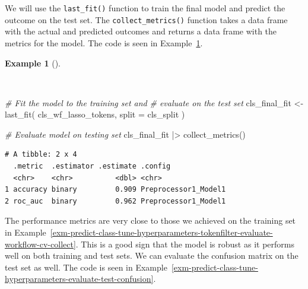 \documentclass[
  letterpaper,
]{book}
\newenvironment{Shaded}{\begin{snugshade}}{\end{snugshade}}
\newcommand{\AttributeTok}[1]{\textcolor[rgb]{0.00,0.00,0.00}{#1}}
\newcommand{\CommentTok}[1]{\textcolor[rgb]{0.00,0.00,0.00}{\textit{#1}}}
\newcommand{\FunctionTok}[1]{\textcolor[rgb]{0.00,0.00,0.00}{#1}}
\newcommand{\NormalTok}[1]{\textcolor[rgb]{0.00,0.00,0.00}{#1}}
\newcommand{\OtherTok}[1]{\textcolor[rgb]{0.00,0.00,0.00}{#1}}
\newcommand{\SpecialCharTok}[1]{\textcolor[rgb]{0.00,0.00,0.00}{#1}}
\theoremstyle{definition}
\newtheorem{example}{Example}[chapter]
\theoremstyle{remark}
\begin{document}
We will use the \texttt{last\_fit()} function to train the final model
and predict the outcome on the test set. The \texttt{collect\_metrics()}
function takes a data frame with the actual and predicted outcomes and
returns a data frame with the metrics for the model. The code is seen in
Example~\ref{exm-predict-class-tune-hyperparameters-evaluate-test}.

\begin{example}[]\protect\hypertarget{exm-predict-class-tune-hyperparameters-evaluate-test}{}\label{exm-predict-class-tune-hyperparameters-evaluate-test}

~

\begin{Shaded}
\begin{Highlighting}[]
\CommentTok{\# Fit the model to the training set and}
\CommentTok{\# evaluate on the test set}
\NormalTok{cls\_final\_fit }\OtherTok{\textless{}{-}}
  \FunctionTok{last\_fit}\NormalTok{(}
\NormalTok{    cls\_wf\_lasso\_tokens,}
    \AttributeTok{split =}\NormalTok{ cls\_split}
\NormalTok{  )}

\CommentTok{\# Evaluate model on testing set}
\NormalTok{cls\_final\_fit }\SpecialCharTok{|\textgreater{}}
  \FunctionTok{collect\_metrics}\NormalTok{()}
\end{Highlighting}
\end{Shaded}

\begin{verbatim}
# A tibble: 2 x 4
  .metric  .estimator .estimate .config             
  <chr>    <chr>          <dbl> <chr>               
1 accuracy binary         0.909 Preprocessor1_Model1
2 roc_auc  binary         0.962 Preprocessor1_Model1
\end{verbatim}

\end{example}

The performance metrics are very close to those we achieved on the
training set in
Example~\ref{exm-predict-class-tune-hyperparameters-tokenfilter-evaluate-workflow-cv-collect}.
This is a good sign that the model is robust as it performs well on both
training and test sets. We can evaluate the confusion matrix on the test
set as well. The code is seen in
Example~\ref{exm-predict-class-tune-hyperparameters-evaluate-test-confusion}.
\end{document}
